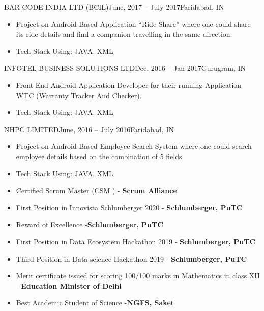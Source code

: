 \documentclass[9pt,a4paper,ragged2e, normalphoto]{altacv}
\begin{document}
\divider

 {BAR CODE INDIA LTD (BCIL)}{June, 2017 -- July 2017}{Faridabad, IN}{}{}
\begin{itemize}
 \item Project on Android Based Application “Ride Share” where one could share its ride details and find a companion travelling in the same direction.
 \item Tech Stack Using: JAVA, XML
\end{itemize}

\divider

 {INFOTEL BUSINESS SOLUTIONS LTD}{Dec, 2016 -- Jan 2017}{Gurugram, IN}{}{}
\begin{itemize}
 \item Front End Android Application Developer for their running Application WTC (Warranty Tracker And Checker).
 \item Tech Stack Using: JAVA, XML
\end{itemize}

\divider

 {NHPC LIMITED}{June, 2016 -- July 2016}{Faridabad, IN}{}{}
\begin{itemize}
 \item Project on Android Based Employee Search System where one could search employee details based on the combination of 5 fields.
 \item Tech Stack Using: JAVA, XML
\end{itemize}



\begin{itemize}
    \item Certified Scrum Master \textsuperscript{\textregistered} (CSM \textsuperscript{\textregistered}) -  \textbf{ \href{https://bcert.me/sgoqtatkm}{Scrum Alliance}} \faChain\hspace{0.5em}
    \item First Position in Innovista Schlumberger 2020 - \textbf{Schlumberger, PuTC}
    \item Reward of Excellence -\textbf{Schlumberger, PuTC}
    \item First Position in Data Ecosystem Hackathon 2019  - \textbf{Schlumberger, PuTC}
    \item Third Position in Data science Hackathon 2019  - \textbf{Schlumberger, PuTC }
    \item Merit certificate issued for scoring 100/100 marks in Mathematics in class XII  - \textbf{Education Minister of Delhi}
    \item Best Academic Student of Science -\textbf{NGFS, Saket}
\end{itemize}
\end{document}
